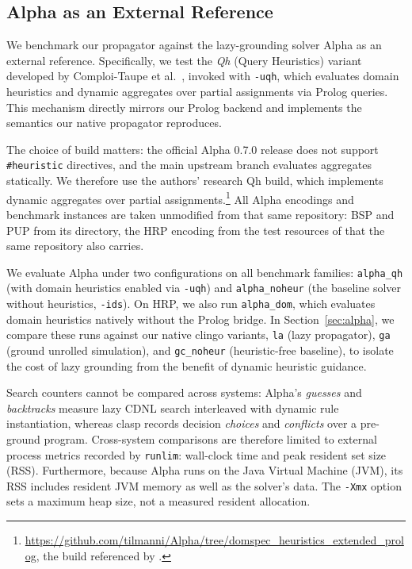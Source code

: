 \subsection{Alpha as an External Reference}
\label{sec:alpha-setup}

We benchmark our propagator against the lazy-grounding solver Alpha \cite{weinzierl2017blending,comploi2023domain} as an external reference. Specifically, we test the \emph{Qh} (Query Heuristics) variant developed by Comploi-Taupe et al.~\cite{comploi2023dynamicAggregates}, invoked with \texttt{-uqh}, which evaluates domain heuristics and dynamic aggregates over partial assignments via Prolog queries. This mechanism directly mirrors our Prolog backend and implements the semantics our native propagator reproduces.

The choice of build matters: the official Alpha 0.7.0 release does not support \texttt{\#heuristic} directives, and the main upstream branch evaluates aggregates statically. We therefore use the authors' research Qh build, which implements dynamic aggregates over partial assignments.\footnote{\url{https://github.com/tilmanni/Alpha/tree/domspec_heuristics_extended_prolog}, the build referenced by \cite{comploi2023dynamicAggregates}.} All Alpha encodings and benchmark instances are taken unmodified from that same repository: BSP and PUP from its  directory, the HRP encoding from the test resources of \cite{comploi2023domain} that the same repository also carries.

We evaluate Alpha under two configurations on all benchmark families: \texttt{alpha\_qh} (with domain heuristics enabled via \texttt{-uqh}) and \texttt{alpha\_noheur} (the baseline solver without heuristics, \texttt{-ids}). On HRP, we also run \texttt{alpha\_dom}, which evaluates domain heuristics natively without the Prolog bridge. In Section~\ref{sec:alpha}, we compare these runs against our native clingo variants, \texttt{la} (lazy propagator), \texttt{ga} (ground unrolled simulation), and \texttt{gc\_noheur} (heuristic-free baseline), to isolate the cost of lazy grounding from the benefit of dynamic heuristic guidance.

Search counters cannot be compared across systems: Alpha's \emph{guesses} and \emph{backtracks} measure lazy CDNL search interleaved with dynamic rule instantiation, whereas clasp records decision \emph{choices} and \emph{conflicts} over a pre-ground program. Cross-system comparisons are therefore limited to external process metrics recorded by \texttt{runlim}: wall-clock time and peak resident set size (RSS). Furthermore, because Alpha runs on the Java Virtual Machine (JVM), its RSS includes resident JVM memory as well as the solver's data. The \texttt{-Xmx} option sets a maximum heap size, not a measured resident allocation.

